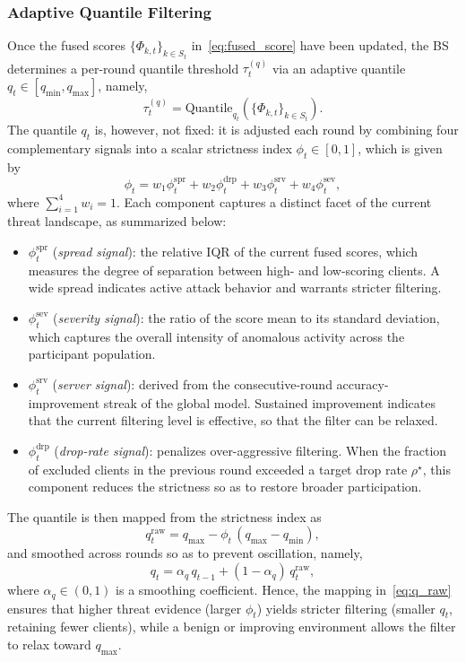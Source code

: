 \documentclass[journal]{IEEEtran}
\begin{document}
\subsubsection{Adaptive Quantile Filtering}
Once the fused scores $\{\Phi_{k,t}\}_{k\in S_t}$ in~\eqref{eq:fused_score} have been updated, the BS determines a per-round quantile threshold $\tau_t^{(q)}$ via an adaptive quantile $q_t \in [q_{\min}, q_{\max}]$, namely,
\begin{equation}
\tau_t^{(q)} = \text{Quantile}_{q_t}\!\left(\{\Phi_{k,t}\}_{k \in S_t}\right).
\label{eq:filt_threshold}
\end{equation}
The quantile $q_t$ is, however, not fixed: it is adjusted each round by combining four complementary signals into a scalar strictness index $\phi_t \in [0,1]$, which is given by
\begin{equation}
\phi_t = w_1 \phi_t^{\mathrm{spr}} + w_2 \phi_t^{\mathrm{drp}} + w_3 \phi_t^{\mathrm{srv}} + w_4 \phi_t^{\mathrm{sev}},
\label{eq:strictness}
\end{equation}
where $\sum_{i=1}^{4} w_i = 1$. Each component captures a distinct facet of the current threat landscape, as summarized below:
\begin{itemize}
    \item $\phi_t^{\mathrm{spr}}$ (\emph{spread signal}): the relative IQR of the current fused scores, which measures the degree of separation between high- and low-scoring clients. A wide spread indicates active attack behavior and warrants stricter filtering.
    \item $\phi_t^{\mathrm{sev}}$ (\emph{severity signal}): the ratio of the score mean to its standard deviation, which captures the overall intensity of anomalous activity across the participant population.
    \item $\phi_t^{\mathrm{srv}}$ (\emph{server signal}): derived from the consecutive-round accuracy-improvement streak of the global model. Sustained improvement indicates that the current filtering level is effective, so that the filter can be relaxed.
    \item $\phi_t^{\mathrm{drp}}$ (\emph{drop-rate signal}): penalizes over-aggressive filtering. When the fraction of excluded clients in the previous round exceeded a target drop rate $\rho^{\star}$, this component reduces the strictness so as to restore broader participation.
\end{itemize}

The quantile is then mapped from the strictness index as
\begin{equation}
q_t^{\mathrm{raw}} = q_{\max} - \phi_t\,(q_{\max} - q_{\min}),
\label{eq:q_raw}
\end{equation}
and smoothed across rounds so as to prevent oscillation, namely,
\begin{equation}
q_t = \alpha_q\, q_{t-1} + (1-\alpha_q)\, q_t^{\mathrm{raw}},
\label{eq:q_smooth}
\end{equation}
where $\alpha_q \in (0,1)$ is a smoothing coefficient. Hence, the mapping in~\eqref{eq:q_raw} ensures that higher threat evidence (larger $\phi_t$) yields stricter filtering (smaller $q_t$, retaining fewer clients), while a benign or improving environment allows the filter to relax toward $q_{\max}$.
\end{document}
